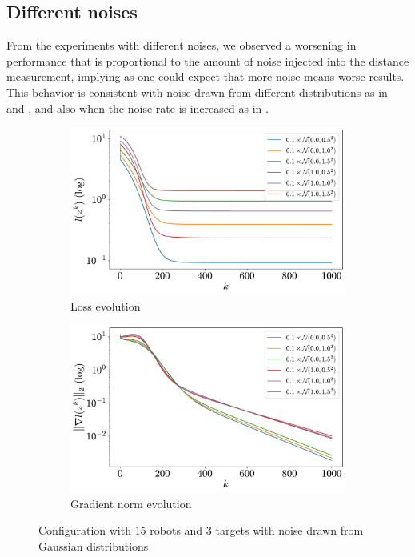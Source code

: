\documentclass[a4paper,11pt,oneside]{book}
\begin{document}
\subsection{Different noises}

From the experiments with different noises, we observed a worsening in performance that is proportional to the amount of noise injected into the distance measurement, implying as one could expect that more noise means worse results. This behavior is consistent with noise drawn from different distributions as in  and , and also when the noise rate is increased as in .

\begin{figure}[H]
      \centering
      \begin{subfigure}[t]{0.49\textwidth}
            \centering
            \includegraphics[width=\linewidth]{./figs/tracking/loss_gaussian_15_3_2_1000.pdf} 
            \caption{Loss evolution}
      \end{subfigure}
      \hfill
      \begin{subfigure}[t]{0.49\textwidth}
            \centering
            \includegraphics[width=\linewidth]{./figs/tracking/gradient_gaussian_15_3_2_1000.pdf} 
            \caption{Gradient norm evolution}
      \end{subfigure}
      \caption{Configuration with $15$ robots and $3$ targets with noise drawn from Gaussian distributions}
      \label{fig:tracking_gaussian_15_3}
\end{figure}
\end{document}
